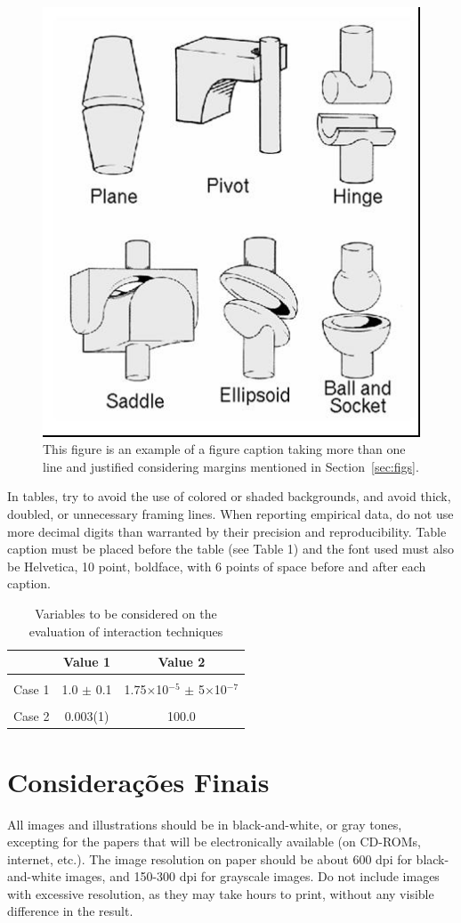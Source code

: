 \documentclass[12pt]{article}
\begin{document}
\begin{figure}[ht]
\centering
\includegraphics[width=.3\textwidth]{fig2.jpg}
\caption{This figure is an example of a figure caption taking more than one
  line and justified considering margins mentioned in Section~\ref{sec:figs}.}
\label{fig:exampleFig2}
\end{figure}

In tables, try to avoid the use of colored or shaded backgrounds, and avoid
thick, doubled, or unnecessary framing lines. When reporting empirical data,
do not use more decimal digits than warranted by their precision and
reproducibility. Table caption must be placed before the table (see Table 1)
and the font used must also be Helvetica, 10 point, boldface, with 6 points of
space before and after each caption.

\begin{table}[ht]
\centering
\caption{Variables to be considered on the evaluation of interaction
  techniques}
\label{tab:exTable1}
\smallskip
\begin{tabular}{|l|c|c|}
\hline
& Value 1 & Value 2\\[0.5ex]
\hline
&&\\[-2ex]
Case 1 & 1.0 $\pm$ 0.1 & 1.75$\times$10$^{-5}$ $\pm$ 5$\times$10$^{-7}$\\[0.5ex]
\hline
&&\\[-2ex]
Case 2 & 0.003(1) & 100.0\\[0.5ex]
\hline
\end{tabular}
\end{table}

\section{Considerações Finais}

All images and illustrations should be in black-and-white, or gray tones,
	excepting for the papers that will be electronically available (on CD-ROMs,
	internet, etc.). The image resolution on paper should be about 600 dpi for
	black-and-white images, and 150-300 dpi for grayscale images.  Do not include
	images with excessive resolution, as they may take hours to print, without any
	visible difference in the result. 
	
\end{document}
